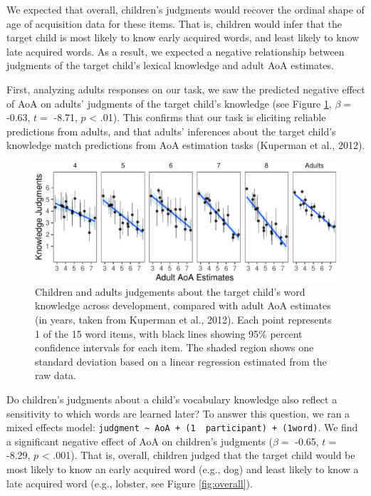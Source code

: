 \documentclass[10pt, letterpaper]{article}
\newenvironment{CodeChunk}{}{}
\begin{document}
We expected that overall, children's judgments would recover the ordinal
shape of age of acquisition data for these items. That is, children
would infer that the target child is most likely to know early acquired
words, and least likely to know late acquired words. As a result, we
expected a negative relationship between judgments of the target child's
lexical knowledge and adult AoA estimates.

First, analyzing adults responses on our task, we saw the predicted
negative effect of AoA on adults' judgments of the target child's
knowledge (see Figure \ref{fig:development}, \(\beta =\) -0.63, \(t =\)
-8.71, \(p\) \textless{} .01). This confirms that our task is eliciting
reliable predictions from adults, and that adults' inferences about the
target child's knowledge match predictions from AoA estimation tasks
(Kuperman et al., 2012).

\begin{CodeChunk}
\begin{figure}[tb]
\includegraphics{figs/development-1} \caption[Children and adults judgements about the target child's word knowledge across development, compared with adult AoA estimates (in years, taken from Kuperman et al., 2012)]{Children and adults judgements about the target child's word knowledge across development, compared with adult AoA estimates (in years, taken from Kuperman et al., 2012). Each point represents 1 of the 15 word items, with black lines showing 95\% percent confidence intervals for each item. The shaded region shows one standard deviation based on a linear regression estimated from the raw data.}\label{fig:development}
\end{figure}
\end{CodeChunk}

Do children's judgments about a child's vocabulary knowledge also
reflect a sensitivity to which words are learned later? To answer this
question, we ran a mixed effects model:
\texttt{judgment\ \textasciitilde{}\ AoA\ +\ (1\ \textbar{}\ participant)\ +\ (1\textbar{}word)}.
We find a significant negative effect of AoA on children's judgments
(\(\beta =\) -0.65, \(t =\) -8.29, \(p\) \textless{} .001). That is,
overall, children judged that the target child would be most likely to
know an early acquired word (e.g., dog) and least likely to know a late
acquired word (e.g., lobster, see Figure \ref{fig:overall}).
\end{document}
